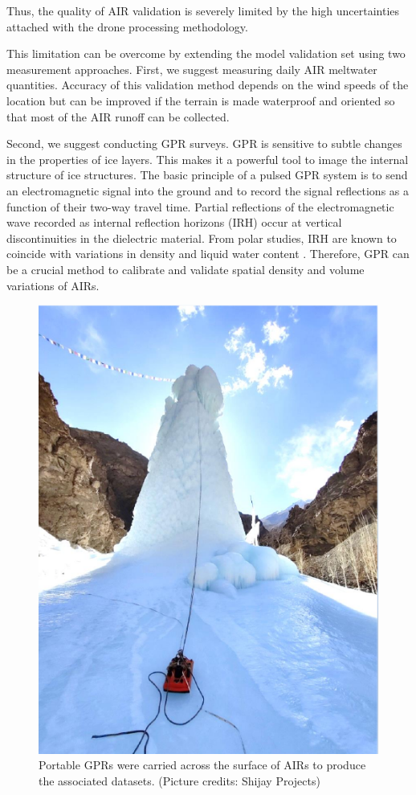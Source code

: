 Thus, the quality of AIR validation is severely limited by the high uncertainties attached with the drone
processing methodology.

This limitation can be overcome by extending the model validation set using two measurement approaches. First,
we suggest measuring daily AIR meltwater quantities. Accuracy of this validation method depends on the wind
speeds of the location but can be improved if the terrain is made waterproof and oriented so that most of the
AIR runoff can be collected. 

Second, we suggest conducting \ac{GPR} surveys. \ac{GPR} is sensitive to subtle changes in the properties of ice
layers. This makes it a powerful tool to image the internal structure of ice structures. The basic principle of
a pulsed \ac{GPR} system is to send an electromagnetic signal into the ground and to record the signal
reflections as a function of their two-way travel time. Partial reflections of the electromagnetic wave recorded
as internal reflection horizons (IRH) occur at vertical discontinuities in the dielectric material. From polar
studies, IRH are known to coincide with variations in density and liquid water content
\citep{forster2014extensive}. Therefore, \ac{GPR} can be a crucial method to calibrate and validate spatial
density and volume variations of \ac{AIRs}.


\begin{figure}[htb]
  \centering
	\includegraphics[width=8 cm]{figs/gpr_survey}
  \caption{Portable \ac{GPR}s were carried across the surface of \ac{AIRs} to produce the associated datasets. (Picture credits:
  Shijay Projects)}
	\label{fig:gpr_survey}
\end{figure}

